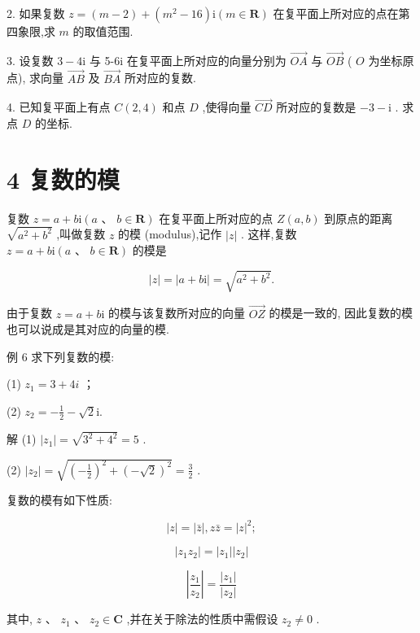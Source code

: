 \documentclass[10pt]{article}
\begin{document}
2. 如果复数 \(z = \left( {m - 2}\right)  + \left( {{m}^{2} - {16}}\right) \mathrm{i}\left( {m \in  \mathbf{R}}\right)\) 在复平面上所对应的点在第四象限,求 \(m\) 的取值范围.

3. 设复数 \(3 - 4\mathrm{i}\) 与 5-6i 在复平面上所对应的向量分别为 \(\overrightarrow{OA}\) 与 \(\overrightarrow{OB}\) ( \(O\) 为坐标原点), 求向量 \(\overrightarrow{AB}\) 及 \(\overrightarrow{BA}\) 所对应的复数.

4. 已知复平面上有点 \(C\left( {2,4}\right)\) 和点 \(D\) ,使得向量 \(\overrightarrow{CD}\) 所对应的复数是 \(- 3 - \mathrm{i}\) . 求点 \(D\) 的坐标.

\section*{4 复数的模}

复数 \(z = a + b\mathrm{i}\left( {a\text{ 、 }b \in  \mathbf{R}}\right)\) 在复平面上所对应的点 \(Z\left( {a,b}\right)\) 到原点的距离 \(\sqrt{{a}^{2} + {b}^{2}}\) ,叫做复数 \(z\) 的模 (modulus),记作 \(\left| z\right|\) . 这样,复数 \(z = a + b\mathrm{i}\left( {a\text{ 、 }b \in  \mathbf{R}}\right)\) 的模是

\[
\left| z\right|  = \left| {a + b\mathrm{i}}\right|  = \sqrt{{a}^{2} + {b}^{2}}.
\]

由于复数 \(z = a + b\mathrm{i}\) 的模与该复数所对应的向量 \(\overrightarrow{OZ}\) 的模是一致的, 因此复数的模也可以说成是其对应的向量的模.

例 6 求下列复数的模:

(1) \({z}_{1} = 3 + {4i}\) ；

(2) \({z}_{2} =  - \frac{1}{2} - \sqrt{2}\mathrm{i}.\)

解 (1) \(\left| {z}_{1}\right|  = \sqrt{{3}^{2} + {4}^{2}} = 5\) .

(2) \(\left| {z}_{2}\right|  = \sqrt{{\left( -\frac{1}{2}\right) }^{2} + {\left( -\sqrt{2}\right) }^{2}} = \frac{3}{2}\) .

复数的模有如下性质:

\[
\left| z\right|  = \left| \bar{z}\right| ,z\bar{z} = {\left| z\right| }^{2};
\]

\[
\left| {{z}_{1}{z}_{2}}\right|  = \left| {z}_{1}\right| \left| {z}_{2}\right|
\]

\[
\left| \frac{{z}_{1}}{{z}_{2}}\right|  = \frac{\left| {z}_{1}\right| }{\left| {z}_{2}\right| }
\]

其中, \(z\text{ 、 }{z}_{1}\text{ 、 }{z}_{2} \in  \mathbf{C}\) ,并在关于除法的性质中需假设 \({z}_{2} \neq  0\) .
\end{document}
